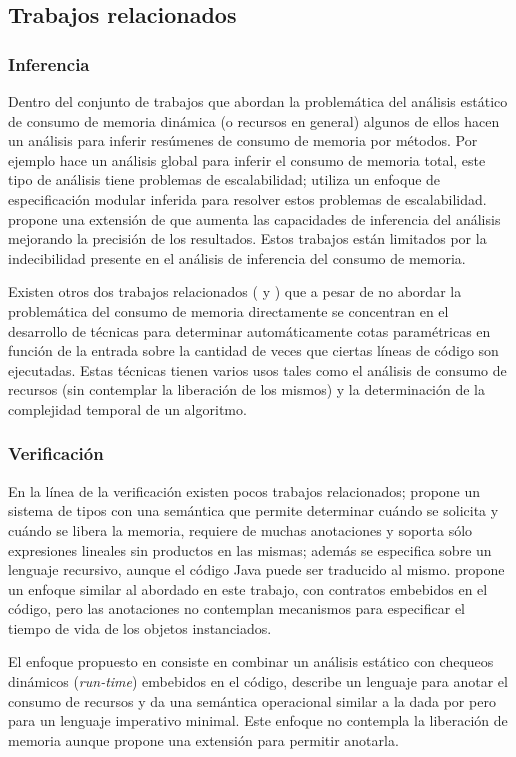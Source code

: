 \documentclass[12pt,a4paper]{article}
\begin{document}
		\subsection{Trabajos relacionados}
			\subsubsection{Inferencia}
				Dentro del conjunto de trabajos que abordan la problemática del análisis estático de consumo de memoria dinámica (o recursos en general) algunos de ellos hacen un análisis para inferir resúmenes de consumo de memoria por métodos. Por ejemplo \cite{Gar07} hace un análisis global para inferir el consumo de memoria total, este tipo de análisis tiene problemas de escalabilidad; \cite{Rou09} utiliza un enfoque de especificación modular inferida para resolver estos problemas de escalabilidad. \cite{testisKrasnyGrunberg} propone una extensión de \cite{Rou09} que aumenta las capacidades de inferencia del análisis mejorando la precisión de los resultados. Estos trabajos están limitados por la indecibilidad presente en el análisis de inferencia del consumo de memoria.

				Existen otros dos trabajos relacionados (\cite{Cav09} y \cite{Pldi10}) que a pesar de no abordar la problemática del consumo de memoria directamente se concentran en el desarrollo de técnicas para determinar automáticamente cotas paramétricas en función de la entrada sobre la cantidad de veces que ciertas líneas de código son ejecutadas. Estas técnicas tienen varios usos tales como el análisis de consumo de recursos (sin contemplar la liberación de los mismos) y la determinación de la complejidad temporal de un algoritmo.
			\subsubsection{Verificación}
				En la línea de la verificación existen pocos trabajos relacionados; \cite{Sas05} propone un sistema de tipos con una semántica que permite determinar cuándo se solicita y cuándo se libera la memoria, requiere de muchas anotaciones y soporta sólo expresiones lineales sin productos en las mismas; además se especifica sobre un lenguaje recursivo, aunque el código Java puede ser traducido al mismo. \cite{Gmg05} propone un enfoque similar al abordado en este trabajo, con contratos embebidos en el código, pero las anotaciones no contemplan mecanismos para especificar el tiempo de vida de los objetos instanciados.

				El enfoque propuesto en \cite{Esop05} consiste en combinar un análisis estático con chequeos dinámicos (\textit{run-time}) embebidos en el código, describe un lenguaje para anotar el consumo de recursos y da una semántica operacional similar a la dada por \cite{Sas05} pero para un lenguaje imperativo minimal. Este enfoque no contempla la liberación de memoria aunque propone una extensión para permitir anotarla.
\end{document}
